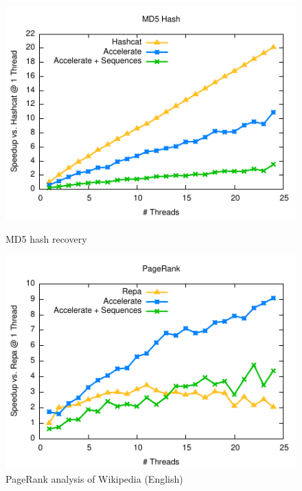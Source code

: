 \begin{figure}
\begin{minipage}{0.5\textwidth}
    \includegraphics[width=\textwidth]{benchmarks/hashcat/figs/hashcat.pdf}
    \caption{MD5 hash recovery}
    \label{fig:hashcat}
  \end{minipage}%
  \begin{minipage}{0.5\textwidth}%
    \includegraphics[width=\textwidth]{benchmarks/pagerank/figs/pagerank.pdf}
    \caption{PageRank analysis of Wikipedia (English)}
    \label{fig:pagerank}
  \end{minipage}%
\end{figure}

